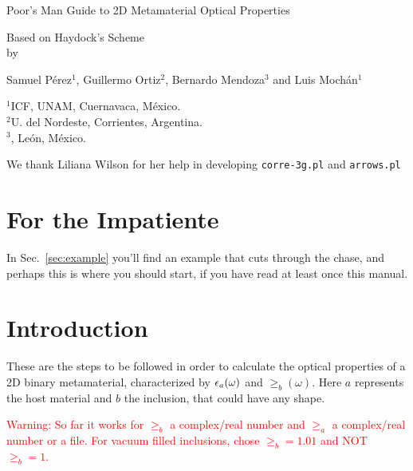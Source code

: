 \documentclass[preprint,12pt]{revtex4}
\begin{document}
\begin{center}
\strut

\vspace{2cm}

Poor's Man Guide to 2D Metamaterial Optical Properties 
\vspace{2cm}


Based on Haydock's Scheme\\

\vspace{2cm}
by

\vspace{2cm} 
Samuel Pérez$^1$, Guillermo Ortiz$^2$, Bernardo Mendoza$^3$ 
and Luis Mochán$^1$
\vspace{2cm}

$^1$ICF, UNAM, Cuernavaca, México.\\
$^2$U. del Nordeste, Corrientes, Argentina.\\
$^3$\cio, León, México.

\vfill
We thank Liliana Wilson for her help in developing \verb=corre-3g.pl=
and \verb=arrows.pl=
\end{center}
\newpage

\tableofcontents
\section{For the Impatiente}

In Sec.~\ref{sec:example} you'll find an example that cuts through the
chase, and perhaps this is where you should start, if you have read at
least once this manual.

\section{Introduction} 
These are the steps to be followed in order to calculate the optical
properties of a 2D binary metamaterial, characterized by $\epsilon_a(\omega)$
and $\ge_{b}(\omega)$. Here $a$ represents the host material and $b$ the
inclusion, that could have any shape.

\textcolor{red}{Warning: So far it works for $\ge_b$ a complex/real number and
  $\ge_a$ a complex/real number or a file. For vacuum filled
  inclusions, chose $\ge_b=1.01$ and NOT $\ge_b=1$.} 
\end{document}
